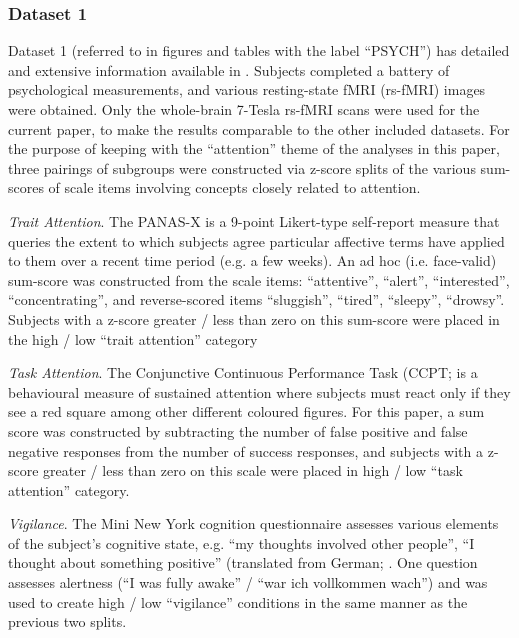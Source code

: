 \documentclass[NETN,manuscript]{stjour-new}
\begin{document}
\subsubsection{Dataset 1}
Dataset 1 (referred to in figures and tables with the label ``PSYCH'') has detailed and extensive
information available in \cite{gorgolewskiHighResolution7Tesla2015}. Subjects completed a battery of
psychological measurements, and various resting-state fMRI (rs-fMRI) images were obtained. Only the
whole-brain 7-Tesla rs-fMRI scans were used for the current paper, to make the results comparable to
the other included datasets. For the purpose of keeping with the ``attention'' theme of the analyses
in this paper, three pairings of subgroups were constructed via z-score splits of the various
sum-scores of scale items involving concepts closely related to attention.

\emph{Trait Attention}.
The PANAS-X \citep{watsonPANASXManualPositive1994} is a 9-point Likert-type self-report measure
that queries the extent to which subjects agree particular affective terms have applied to them over
a recent time period (e.g. a few weeks). An ad hoc (i.e. face-valid) sum-score was constructed from
the scale items: ``attentive'', ``alert'', ``interested'', ``concentrating'', and reverse-scored items
``sluggish'', ``tired'', ``sleepy'', ``drowsy''. Subjects with a z-score greater / less than zero on this
sum-score were placed in the high / low ``trait attention'' category

\emph{Task Attention}.
The Conjunctive Continuous Performance Task (CCPT;
\cite{shalevConjunctiveContinuousPerformance2011} is a behavioural measure of sustained attention
where subjects must react only if they see a red square among other different coloured figures. For
this paper, a sum score was constructed by subtracting the number of false positive and false
negative responses from the number of success responses, and subjects with a z-score greater / less
than zero on this scale were placed in high / low ``task attention'' category.

\emph{Vigilance}.
The Mini New York cognition questionnaire assesses various elements of the subject's cognitive
state, e.g. ``my thoughts involved other people'', ``I thought about something positive'' (translated
from German; \cite{gorgolewskiCorrespondenceIndividualDifferences2014}. One question assesses
alertness (``I was fully awake'' / ``war ich vollkommen wach'') and was used to create high / low
``vigilance'' conditions in the same manner as the previous two splits.
\end{document}
